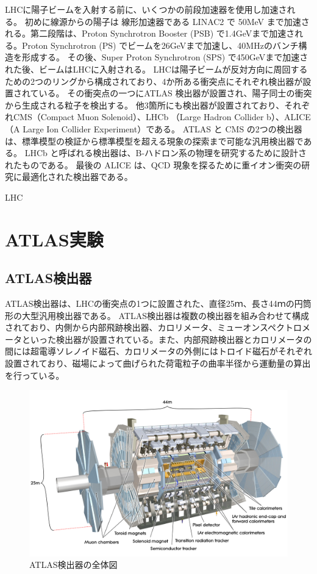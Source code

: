 LHCに陽子ビームを入射する前に、いくつかの前段加速器を使用し加速される。
初めに線源からの陽子は 線形加速器である LINAC2 で 50MeV まで加速される。第二段階は、Proton Synchrotron Booster (PSB) で1.4GeVまで加速される。Proton Synchrotron (PS) でビームを26GeVまで加速し、40MHzのバンチ構造を形成する。
その後、Super Proton Synchrotron (SPS) で450GeVまで加速された後、ビームはLHCに入射される。
LHCは陽子ビームが反対方向に周回するための2つのリングから構成されており、4か所ある衝突点にそれぞれ検出器が設置されている。
その衝突点の一つにATLAS 検出器が設置され、陽子同士の衝突から生成される粒子を検出する。
 他3箇所にも検出器が設置されており、それぞれCMS（Compact Muon Solenoid）、LHCb （Large Hadron Collider b）、ALICE （A Large Ion Collider Experiment）である。
 ATLAS と CMS の2つの検出器は、標準模型の検証から標準模型を超える現象の探索まで可能な汎用検出器である。
 LHCb と呼ばれる検出器は、B-ハドロン系の物理を研究するために設計されたものである。
 最後の ALICE は、QCD 現象を探るために重イオン衝突の研究に最適化された検出器である。

LHC

\section{ATLAS実験}
\label{section2-2}
\subsection{ATLAS検出器}
ATLAS検出器は、LHCの衝突点の1つに設置された、直径25ｍ、長さ44ｍの円筒形の大型汎用検出器である。
ATLAS検出器は複数の検出器を組み合わせて構成されており、内側から内部飛跡検出器、カロリメータ、ミューオンスペクトロメータといった検出器が設置されている。また、内部飛跡検出器とカロリメータの間には超電導ソレノイド磁石、カロリメータの外側にはトロイド磁石がそれぞれ設置されており、磁場によって曲げられた荷電粒子の曲率半径から運動量の算出を行っている。

\begin{figure}[tb]
  \centering
  \includegraphics[clip,width=14cm]{fig/2/0803012_01.jpg}
  \caption{ATLAS検出器の全体図}
  \label{fig:ATLAS検出器}
\end{figure}


